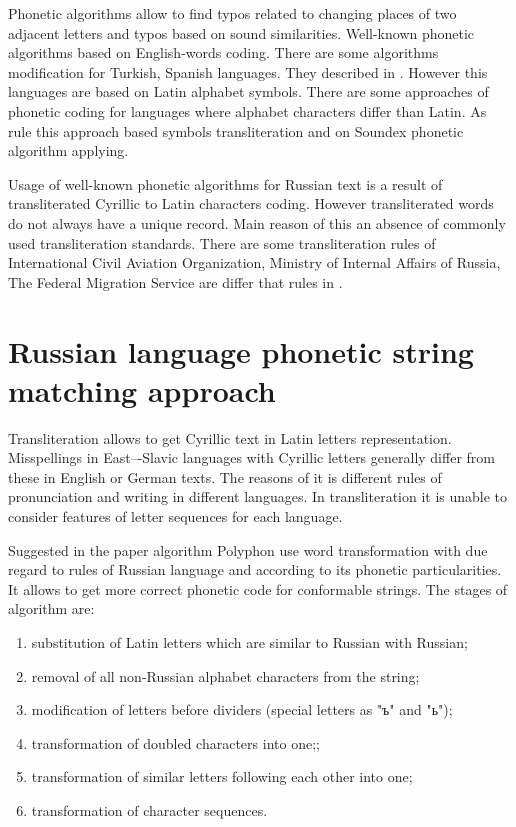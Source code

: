 \documentclass{svproc}
\begin{document}
Phonetic algorithms allow to find typos related to changing places of two adjacent letters and typos based on sound similarities. Well-known phonetic algorithms based on English-words coding. There are some algorithms modification for Turkish, Spanish languages. They described in \cite{Alotaibi-2013}. However this languages are based on Latin alphabet symbols. There are some approaches of phonetic coding for languages where alphabet characters differ than Latin. As rule this approach based symbols transliteration and on Soundex phonetic algorithm \cite{Soundex} applying.

Usage of well-known phonetic algorithms for Russian text is a result of transliterated Cyrillic to Latin characters coding. However transliterated words do not always have a unique record. Main reason of this an absence of commonly used transliteration standards. There are some transliteration rules of International Civil Aviation Organization, Ministry of Internal Affairs of Russia, The Federal Migration Service are differ that rules in \cite{GOST-2006}.

\section{Russian language phonetic string matching approach}
Transliteration allows to get Cyrillic text in Latin letters representation. Misspellings in East–-Slavic languages with Cyrillic letters generally differ from these in English or German texts. The reasons of it is different rules of pronunciation and writing in different languages. In transliteration it is unable to consider features of letter sequences for each language.

Suggested in the paper algorithm Polyphon \cite{Paramonov-2016} use word transformation with due regard to rules of Russian language and according to its phonetic particularities. It allows to get more correct phonetic code for conformable strings. The stages of algorithm are:

\begin{enumerate}
\item substitution of Latin letters which are similar to Russian with Russian;
\item removal of all non-Russian alphabet characters from the string;
\item modification of letters before dividers (special letters as "ъ" and "ь");
\item transformation of doubled characters into one;;
\item transformation of similar letters following each other into one;
\item transformation of character sequences.
\end{enumerate}
\end{document}
